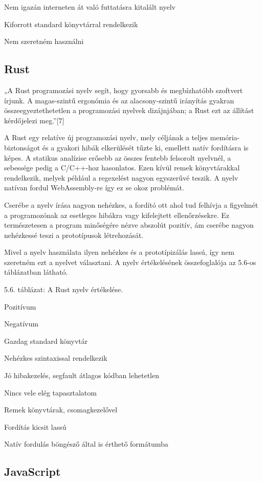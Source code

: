Nem igazán interneten át való futtatásra kitalált nyelv

Kiforrott standard könyvtárral rendelkezik

Nem szeretném használni

\subsection{Rust}

„A Rust programozási nyelv segít, hogy gyorsabb és megbízhatóbb szoftvert írjunk. A magas-szintű ergonómia és az alacsony-szintű irányítás gyakran összeegyeztethetetlen a programozási nyelvek dizájnjában; a Rust ezt az állítást kérdőjelezi meg.”[7]

A Rust egy relatíve új programozási nyelv, mely céljának a teljes memória-biztonságot és a gyakori hibák elkerülését tűzte ki, emellett natív fordításra is képes. A statikus analízise erősebb az összes fentebb felsorolt nyelvnél, a sebessége pedig a C/C++-hoz hasonlatos. Ezen kívül remek könyvtárakkal rendelkezik, melyek például a regexelést nagyon egyszerűvé teszik. A nyelv natívan fordul WebAssembly-re így ez se okoz problémát.

Cserébe a nyelv írása nagyon nehézkes, a fordító ott ahol tud felhívja a figyelmét a programozónak az esetleges hibákra vagy kifelejtett ellenőrzésekre. Ez természetesen a program minőségére nézve abszolút pozitív, ám cserébe nagyon nehézkessé teszi a prototípusok létrehozását.

Mivel a nyelv használata ilyen nehézkes és a prototípizálás lassú, így nem szeretném ezt a nyelvet választani. A nyelv értékelésének összefoglalója az 5.6-os táblázatban látható.

5.6. táblázat: A Rust nyelv értékelése.

Pozitívum

Negatívum

Gazdag standard könyvtár

Nehézkes szintaxissal rendelkezik

Jó hibakezelés, segfault átlagos kódban lehetetlen

Nincs vele elég tapasztalatom

Remek könyvtárak, csomagkezelővel

Fordítás kicsit lassú

Natív fordulás böngésző által is érthető formátumba

\subsection{JavaScript}

